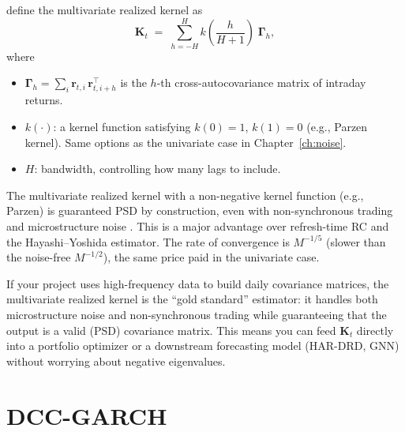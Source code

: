 \begin{definition}
\citet{BarndorffNielsenHansenLundeShephard2011} define the multivariate
realized kernel as
\begin{equation}\label{eq:mrk}
  \mathbf{K}_t \;=\; \sum_{h=-H}^{H} k\!\left(\frac{h}{H+1}\right)
  \;\bm{\Gamma}_h,
\end{equation}
where
\begin{itemize}[nosep]
  \item $\bm{\Gamma}_h = \sum_{i} \mathbf{r}_{t,i}\,\mathbf{r}_{t,i+h}^\top$
        is the $h$-th cross-autocovariance matrix of intraday returns.
  \item $k(\cdot)$: a kernel function satisfying $k(0) = 1$, $k(1) = 0$
        (e.g., Parzen kernel). Same options as the univariate case in
        Chapter~\ref{ch:noise}.
  \item $H$: bandwidth, controlling how many lags to include.
\end{itemize}
\end{definition}

\begin{keyresult}
The multivariate realized kernel with a non-negative kernel function (e.g.,
Parzen) is guaranteed PSD by construction, even with non-synchronous trading
and microstructure noise \citep{BarndorffNielsenHansenLundeShephard2011}. This
is a major advantage over refresh-time RC and the Hayashi--Yoshida estimator.
The rate of convergence is $M^{-1/5}$ (slower than the noise-free $M^{-1/2}$),
the same price paid in the univariate case.
\end{keyresult}

\begin{projectconnection}
If your project uses high-frequency data to build daily covariance matrices,
the multivariate realized kernel is the ``gold standard'' estimator: it handles
both microstructure noise and non-synchronous trading while guaranteeing that
the output is a valid (PSD) covariance matrix. This means you can feed $\mathbf{K}_t$
directly into a portfolio optimizer or a downstream forecasting model (HAR-DRD,
GNN) without worrying about negative eigenvalues.
\end{projectconnection}


\section{DCC-GARCH}\label{sec:multivariate:dcc}

